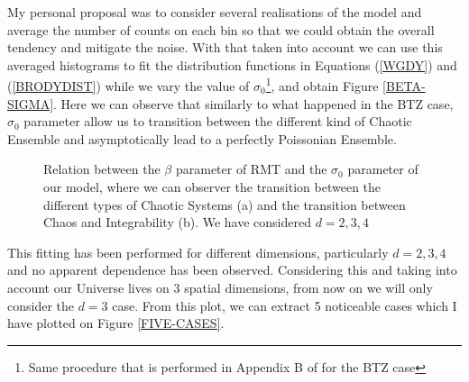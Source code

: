 \documentclass[11pt,a4paper]{article}
\begin{document}
{My personal proposal was to consider several realisations of the model and average the number of counts on each bin so that we could obtain the overall tendency and mitigate the noise. With that taken into account we can use this averaged histograms to fit the distribution functions in Equations (\ref{WGDY}) and (\ref{BRODYDIST}) while we vary the value of $\sigma_0$\footnote{Same procedure that is performed in Appendix B of \cite{Jeong_2025} for the BTZ case}, and obtain Figure \ref{BETA-SIGMA}. Here we can observe that similarly to what happened in the BTZ case, $\sigma_0$ parameter allow us to transition between the different kind of Chaotic Ensemble and asymptotically lead to a perfectly Poissonian Ensemble.

\begin{figure}[h]
    \centering

    \caption{Relation between the $\beta$ parameter of RMT and the $\sigma_0$ parameter of our model, where we can observer the transition between the different types of Chaotic Systems (a) and the transition between Chaos and Integrability (b). We have considered $d=2,3,4$}
\end{figure}

This fitting has been performed for different dimensions, particularly $d=2,3,4$ and no apparent dependence has been observed. Considering this and taking into account our Universe lives on 3 spatial dimensions, from now on we will only consider the $d=3$ case. From this plot, we can extract 5 noticeable cases which I have plotted on Figure \ref{FIVE-CASES}.

}
\end{document}
